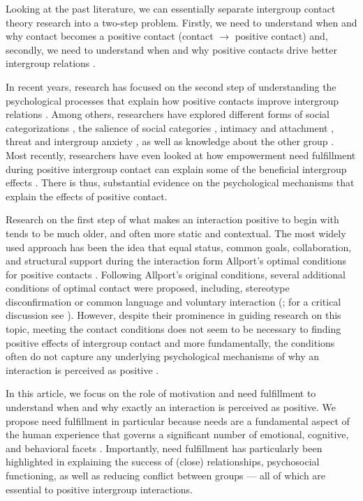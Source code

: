 \documentclass[man, 12pt, a4paper, mask]{apa7}
\theoremstyle{break}
\theoremstyle{plain}
\begin{document}
Looking at the past literature, we can essentially separate intergroup contact theory research into a two-step problem. Firstly, we need to understand when and why contact becomes a positive contact (contact $\rightarrow$ positive contact) and, secondly, we need to understand when and why positive contacts drive better intergroup relations \citep[positive contact $\rightarrow$ better relations; e.g., see ][]{Allport1954b, Hewstone1996, Pettigrew1998}.

In recent years, research has focused on the second step of understanding the psychological processes that explain how positive contacts improve intergroup relations \citep[e.g. see,][]{Paolini2021}. Among others, researchers have explored different forms of social categorizations \citep[][]{Pettigrew1998}, the salience of social categories \citep[][]{Brown2005}, intimacy \citep[e.g.,][]{Marinucci2021} and attachment \citep[e.g.,][]{Tropp2021}, threat and intergroup anxiety \citep[e.g.,][]{Stephan2008}, as well as knowledge about the other group \citep[][]{Pettigrew2008c}. Most recently, researchers have even looked at how empowerment need fulfillment during positive intergroup contact can explain some of the beneficial intergroup effects \citep[][]{Hassler2021}. There is thus, substantial evidence on the psychological mechanisms that explain the effects of positive contact.

Research on the first step of what makes an interaction positive to begin with tends to be much older, and often more static and contextual. The most widely used approach has been the idea that equal status, common goals, collaboration, and structural support during the interaction form Allport's optimal conditions for positive contacts \citep[][]{Allport1954b, Pettigrew1969}. Following Allport's original conditions, several additional conditions of optimal contact were proposed, including, stereotype disconfirmation \citep[][]{cook1978} or common language and voluntary interaction (\citealp{wagner1986}; for a critical discussion see \citealp{Pettigrew1986}). However, despite their prominence in guiding research on this topic, meeting the contact conditions does not seem to be necessary to finding positive effects of intergroup contact \citep[][]{Pettigrew2006} and more fundamentally, the conditions often do not capture any underlying psychological mechanisms of why an interaction is perceived as positive \citep[e.g.,][]{Pettigrew1998}.

In this article, we focus on the role of motivation and need fulfillment to understand when and why exactly an interaction is perceived as positive. We propose need fulfillment in particular because needs are a fundamental aspect of the human experience that governs a significant number of emotional, cognitive, and behavioral facets \citep[][]{Kreienkamp2022d, kruglanski2002}. Importantly, need fulfillment has particularly been highlighted in explaining the success of (close) relationships, psychosocial functioning, as well as reducing conflict between groups --- all of which are essential to positive intergroup interactions.
\end{document}
